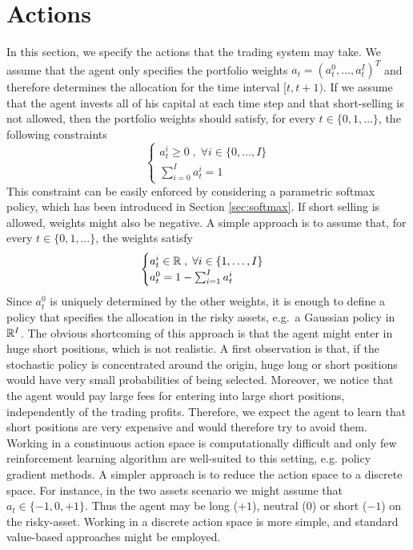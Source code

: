 \section{Actions}
In this section, we specify the actions that the trading system may take. We
assume that the agent only specifies the portfolio weights $a_t = (a_t^0,
\ldots, a_t^I)^T$ and therefore determines the allocation for the time interval
$[t, t+1)$. If we assume that the agent invests all of his capital at each time
step and that short-selling is not allowed, then the portfolio weights should
satisfy, for every $t \in \{0, 1, \ldots\}$, the following constraints
\begin{equation}
	\begin{cases}
		a_t^i \geq 0 \;,\; \forall i \in \{0, \ldots, I\}\\
		\sum^{I}_{i=0} a_t^i = 1 
	\end{cases}
\end{equation}
This constraint can be easily enforced by considering a parametric softmax 
policy, which has been introduced in Section \ref{sec:softmax}. If short 
selling is allowed, weights might also be negative. A simple approach is to 
assume that, for every $t \in \{0, 1, \ldots\}$, the weights satisfy
\begin{equation}
	\begin{cases}
		a_t^i \in \mathbb{R} \;,\; \forall i \in \{1, \ldots, I\}\\
		a_t^0 = 1 - \sum^{I}_{i=1} a_t^i
	\end{cases}
\end{equation}
Since $a_t^0$ is uniquely determined by the other weights, it is enough to
define a policy that specifies the allocation in the risky assets, e.g.\ a
Gaussian policy in $\mathbb{R}^I$. The obvious shortcoming of this approach is that
the agent might enter in huge short positions, which is not realistic. A first
observation is that, if the stochastic policy is concentrated around the
origin, huge long or short positions would have very small probabilities of 
being selected. Moreover, we notice that the agent would pay large fees for 
entering into large short positions, independently of the trading profits. 
Therefore, we expect the agent to learn that short positions are very expensive 
and would therefore try to avoid them.\\
Working in a constinuous action space is computationally difficult and only few
reinforcement learning algorithm are well-suited to this setting, e.g. policy
gradient methods. A simpler approach is to reduce the action space to a discrete 
space. For instance, in the two assets scenario we might assume that $a_t \in
\{-1, 0, +1\}$. Thus the agent may be long ($+1$), neutral ($0$) or short
($-1$) on the risky-asset. Working in a discrete action space is more simple,
and standard value-based approaches might be employed. 
